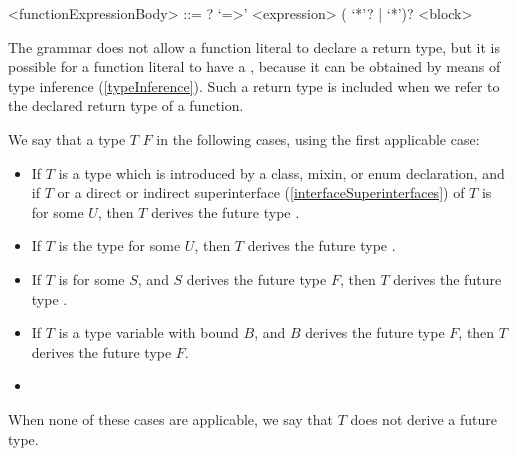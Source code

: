 \documentclass[makeidx]{article}
\begin{document}
{\begin{grammar}
<functionExpressionBody> ::= \ASYNC? `=>' <expression>
  \alt (\ASYNC{} `*'? | \SYNC{} `*')? <block>
\end{grammar}

\LMHash{}%
The grammar does not allow a function literal to declare a return type,
but it is possible for a function literal to have a
,
because it can be obtained by means of type inference
(\ref{typeInference}).
Such a return type is included
when we refer to the declared return type of a function.

\LMHash{}%
We say that a type $T$
$F$ in the following cases, using the first applicable case:

\begin{itemize}
\item
  If $T$ is a type which is introduced by
  a class, mixin, or enum declaration,
  and if $T$ or a direct or indirect superinterface
  (\ref{interfaceSuperinterfaces})
  of $T$ is  for some $U$,
  then $T$ derives the future type .
\item
  If $T$ is the type  for some $U$,
  then $T$ derives the future type .
\item
  If $T$ is  for some $S$, and
  $S$ derives the future type $F$,
  then $T$ derives the future type .
\item
  If $T$ is a type variable with bound $B$, and
  $B$ derives the future type $F$,
  then $T$ derives the future type $F$.
\item
\end{itemize}

\LMHash{}%
When none of these cases are applicable,
we say that $T$ does not derive a future type.

}
\end{document}
